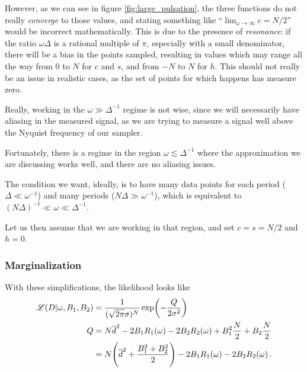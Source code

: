 \documentclass[main.tex]{subfiles}
\begin{document}
However, as we can see in figure \ref{fig:large_pulsation}, the three functions do not really \emph{converge} to those values, and stating something like ``\(\lim_{\omega \to \infty } c = N /2\)'' would be incorrect mathematically.
This is due to the presence of \emph{resonance}: if the ratio \(\omega \Delta \) is a rational multiple of \(\pi \), especially with a small denominator, there will be a bias in the points sampled, resulting in values which may range all the way from 0 to \(N\) for \(c\) and \(s\), and from \(-N\) to \(N\) for \(h\). 
This should not really be an issue in realistic cases, as the set of points for which happens has measure zero. 

Really, working in the \(\omega \gg \Delta^{-1}\) regime is not wise, since we will necessarily have aliasing in the measured signal, as we are trying to measure a signal well above the Nyquist frequency of our sampler.

Fortunately, there is a regime in the region \(\omega \lesssim \Delta^{-1}\) where the approximation we are discussing works well, and there are no aliasing issues. 

The condition we want, ideally, is to have many data points for each period (\(\Delta \ll \omega^{-1}\)) and many periods (\(N \Delta  \gg \omega^{-1}\)), which is equivalent to \((N \Delta )^{-1 } \ll \omega \ll \Delta^{-1} \).

Let us then assume that we are working in that region, and set \(c = s = N/2\) and \(h = 0\).

\subsubsection{Marginalization}

With these simplifications, the likelihood looks like 
%
\begin{align}
\mathscr{L}(D | \omega , B_1 , B_2 ) &= \frac{1}{(\sqrt{2 \pi } \sigma )^{N}}
\exp(- \frac{Q}{2 \sigma^2})  \\
Q &= 
N \overline{d}^2 - 2 B_1 R_1(\omega ) -2 B_2 R_2(\omega ) + B_1^2 \frac{N}{2} + B_2 \frac{N}{2}  \\
&= N \qty(\overline{d}^2 + \frac{B_1^2 + B_2^2}{2}) - 2 B_1 R_1(\omega ) - 2 B_2 R_2(\omega )
\,.
\end{align}
\end{document}
